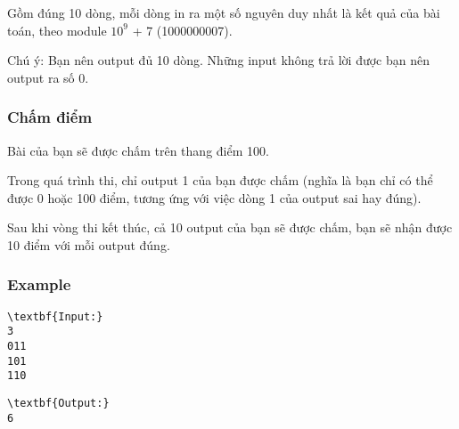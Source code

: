 Gồm đúng 10 dòng, mỗi dòng in ra một số nguyên duy nhất là kết quả của bài toán, theo module $10^{9}$ + 7 (1000000007).

Chú ý: Bạn nên output đủ 10 dòng. Những input không trả lời được bạn nên output ra số 0.
\begin{itemize}
\end{itemize}

\subsubsection{Chấm điểm}

Bài của bạn sẽ được chấm trên thang điểm 100.

Trong quá trình thi, chỉ output 1 của bạn được chấm (nghĩa là bạn chỉ có thể được 0 hoặc 100 điểm, tương ứng với việc dòng 1 của output sai hay đúng).

Sau khi vòng thi kết thúc, cả 10 output của bạn sẽ được chấm, bạn sẽ nhận được 10 điểm với mỗi output đúng.

\subsubsection{Example}
\begin{verbatim}
\textbf{Input:}
3
011
101
110\end{verbatim}
\begin{verbatim}
\textbf{Output:}
6
\end{verbatim}
